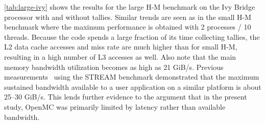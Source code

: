 \documentclass{mc2015}
\begin{document}
\autoref{tab:large-ivy} shows the results for the large H-M benchmark on the Ivy
Bridge processor with and without tallies. Similar trends are seen as in the
small H-M benchmark where the maximum performance is obtained with 2 processes /
10 threads. Because the code spends a large fraction of its time collecting
tallies, the L2 data cache accesses and miss rate are much higher than for small
H-M, resulting in a high number of L3 accesses as well. Also note that the main
memory bandwidth utilization becomes as high as 21 GiB/s. Previous
measurements~\cite{ane-tramm-2014} using the STREAM benchmark demonstrated that
the maximum sustained bandwidth available to a user application on a similar
platform is about 25--30 GiB/s. This lends further evidence to the argument that
in the present study, OpenMC was primarily limited by latency rather than
available bandwidth.
\end{document}
